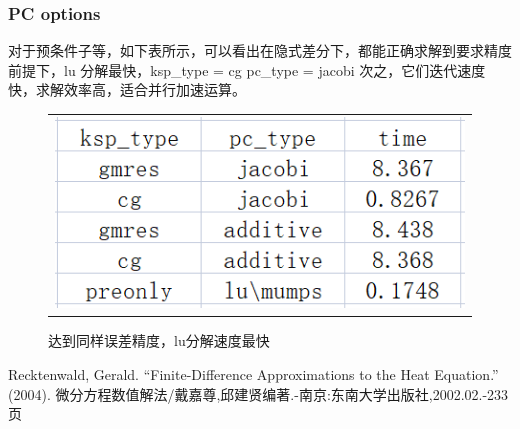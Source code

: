 \documentclass[3p]{elsarticle}
\numberwithin{equation}{section}
\begin{document}
    \subsubsection{PC options}
    对于预条件子等，如下表所示，可以看出在隐式差分下，都能正确求解到要求精度前提下，lu 分解最快，ksp\_type = cg  pc\_type = jacobi 次之，它们迭代速度快，求解效率高，适合并行加速运算。
    \begin{figure}[h]
    	\begin{center}
    		\begin{tabular}{c}
    			\includegraphics[angle=0, scale=0.4]{./figures/pc.png}
    		\end{tabular}
    	\end{center}
    	\caption{达到同样误差精度，lu分解速度最快}
    	\label{fig:illustration-pc}
    \end{figure}
		
	\begin{thebibliography}{99}  
		Recktenwald, Gerald. “Finite-Difference Approximations to the Heat Equation.” (2004).  
		微分方程数值解法/戴嘉尊,邱建贤编著.-南京:东南大学出版社,2002.02.-233页
	\end{thebibliography}
\end{document}

